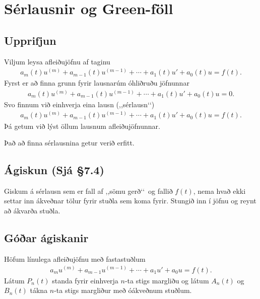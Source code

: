 \documentclass[a4paper,10pt,icelandic]{sphinxmanual}
\begin{document}
\section{Sérlausnir og Green-föll}
\label{\detokenize{Kafli07:serlausnir-og-green-foll}}

\subsection{Upprifjun}
\label{\detokenize{Kafli07:upprifjun}}
Viljum leysa afleiðujöfnu af taginu
\begin{equation*}
\begin{split}a_m(t)u^{(m)}+a_{m-1}(t)u^{(m-1)}+\cdots+a_1(t)u'+a_0(t)u=f(t).\end{split}
\end{equation*}
Fyrst er að finna grunn fyrir lausnarúm óhliðruðu jöfnunnar
\begin{equation*}
\begin{split}a_m(t)u^{(m)}+a_{m-1}(t)u^{(m-1)}+\cdots+a_1(t)u'+a_0(t)u=0.\end{split}
\end{equation*}
Svo finnum við einhverja eina lausn (,,sérlausn‘‘)
\begin{equation*}
\begin{split}a_m(t)u^{(m)}+a_{m-1}(t)u^{(m-1)}+\cdots+a_1(t)u'+a_0(t)u=f(t).\end{split}
\end{equation*}
Þá getum við lýst öllum lausnum afleiðujöfnunnar.

Það að finna sérlausnina getur verið erfitt.


\subsection{Ágiskun (Sjá \S{}7.4)}
\label{\detokenize{Kafli07:agiskun-sja-7-4}}
Giskum á sérlausn sem er fall af ,,sömu gerð‘‘ og fallið \(f(t)\), nema hvað ekki settar inn ákveðnar tölur fyrir stuðla sem koma fyrir. Stungið inn í jöfnu og reynt að ákvarða stuðla.


\subsection{Góðar ágiskanir}
\label{\detokenize{Kafli07:goar-agiskanir}}
Höfum línulega afleiðujöfnu með fastastuðlum
\begin{equation*}
\begin{split}a_mu^{(m)}+a_{m-1}u^{(m-1)}+\cdots+a_1u'+a_0u=f(t).\end{split}
\end{equation*}
Látum \(P_n(t)\) standa fyrir einhverja \(n\)-ta stigs margliðu og látum \(A_n(t)\) og \(B_n(t)\) tákna \(n\)-ta stigs margliður með óákveðnum stuðlum.
\end{document}
